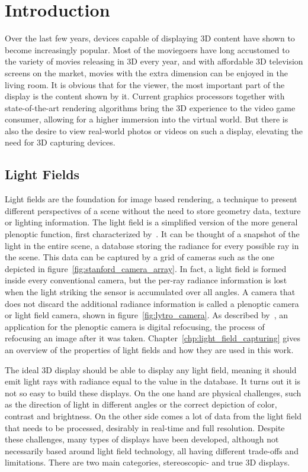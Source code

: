 \chapter{Introduction}
\label{chp:introduction}

Over the last few years, devices capable of displaying 3D content have shown to become increasingly popular.
Most of the moviegoers have long accustomed to the variety of movies releasing in 3D every year, and with affordable 3D television screens on the market, movies with the extra dimension can be enjoyed in the living room.
It is obvious that for the viewer, the most important part of the display is the content shown by it.
Current graphics processors together with state-of-the-art rendering algorithms bring the 3D experience to the video game consumer, allowing for a higher immersion into the virtual world.
But there is also the desire to view real-world photos or videos on such a display, elevating the need for 3D capturing devices.

\section{Light Fields}
Light fields are the foundation for image based rendering, a technique to present different perspectives of a scene without the need to store geometry data, texture or lighting information.
The light field is a simplified version of the more general plenoptic function, first characterized by~\cite{AdelsonBergen}.
It can be thought of a snapshot of the light in the entire scene, a database storing the radiance for every possible ray in the scene.
This data can be captured by a grid of cameras such as the one depicted in figure~\ref{fig:stanford_camera_array}.
In fact, a light field is formed inside every conventional camera, but the per-ray radiance information is lost when the light striking the sensor is accumulated over all angles. 
A camera that does not discard the additional radiance information is called a plenoptic camera or light field camera, shown in figure~\ref{fig:lytro_camera}.
As described by~\cite{LightFieldPhotographyHandHeldPlenopticCamera}, an application for the plenoptic camera is digital refocusing, the process of refocusing an image after it was taken.
Chapter~\ref{chp:light_field_capturing} gives an overview of the properties of light fields and how they are used in this work.

The ideal 3D display should be able to display any light field, meaning it should emit light rays with radiance equal to the value in the database.
It turns out it is not so easy to build these displays. 
On the one hand are physical challenges, such as the direction of light in different angles or the correct depiction of color, contrast and brightness.
On the other side comes a lot of data from the light field that needs to be processed, desirably in real-time and full resolution.
Despite these challenges, many types of displays have been developed, although not necessarily based around light field technology, all having different trade-offs and limitations.
There are two main categories, stereoscopic- and true 3D displays.

